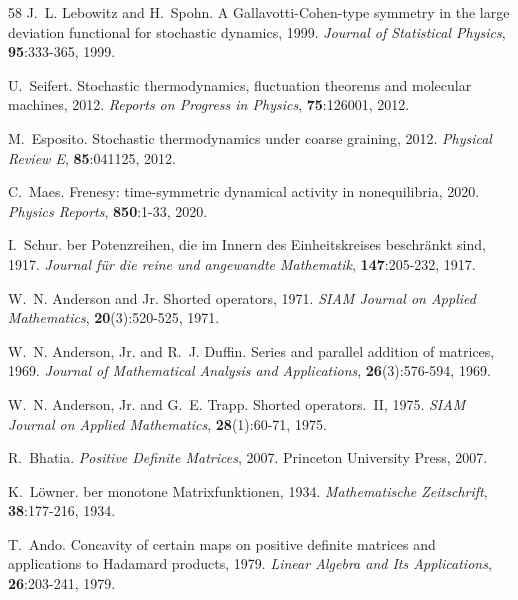 \documentclass[11pt]{article}
\numberwithin{equation}{section}
\theoremstyle{thmcompact}
\theoremstyle{remark}
\begin{document}
\begin{thebibliography}{58}
{J.~L. Lebowitz} and {H.~Spohn}.
\newblock A {G}allavotti-{C}ohen-type symmetry in the large deviation
  functional for stochastic dynamics, 1999.
\newblock \emph{Journal of Statistical Physics}, \textbf{95}:333-365, 1999.

{U.~Seifert}.
\newblock Stochastic thermodynamics, fluctuation theorems and molecular
  machines, 2012.
\newblock \emph{Reports on Progress in Physics}, \textbf{75}:126001, 2012.

{M.~Esposito}.
\newblock Stochastic thermodynamics under coarse graining, 2012.
\newblock \emph{Physical Review E}, \textbf{85}:041125, 2012.

{C.~Maes}.
\newblock Frenesy: time-symmetric dynamical activity in nonequilibria, 2020.
\newblock \emph{Physics Reports}, \textbf{850}:1-33, 2020.

{I.~Schur}.
ber {P}otenzreihen, die im {I}nnern des {E}inheitskreises
  beschr{\"a}nkt sind, 1917.
\newblock \emph{Journal f{\"u}r die reine und angewandte Mathematik},
  \textbf{147}:205-232, 1917.

{W.~N. Anderson} and {Jr}.
\newblock Shorted operators, 1971.
\newblock \emph{SIAM Journal on Applied Mathematics}, \textbf{20}(3):520-525,
  1971.

{W.~N. Anderson, Jr.} and {R.~J. Duffin}.
\newblock Series and parallel addition of matrices, 1969.
\newblock \emph{Journal of Mathematical Analysis and Applications},
  \textbf{26}(3):576-594, 1969.

{W.~N. Anderson, Jr.} and {G.~E. Trapp}.
\newblock Shorted operators.~{II}, 1975.
\newblock \emph{SIAM Journal on Applied Mathematics}, \textbf{28}(1):60-71,
  1975.

{R.~Bhatia}.
\newblock \emph{Positive Definite Matrices}, 2007.
\newblock Princeton University Press, 2007.

{K.~L{\"o}wner}.
ber monotone {M}atrixfunktionen, 1934.
\newblock \emph{Mathematische Zeitschrift}, \textbf{38}:177-216, 1934.

{T.~Ando}.
\newblock Concavity of certain maps on positive definite matrices and
  applications to {H}adamard products, 1979.
\newblock \emph{Linear Algebra and Its Applications}, \textbf{26}:203-241,
  1979.


\end{thebibliography}
\end{document}
